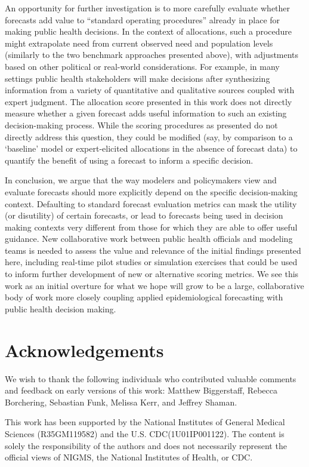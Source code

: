 \documentclass{article}\usepackage[]{graphicx}\usepackage[]{xcolor}
\begin{document}
An opportunity for further investigation is to more carefully evaluate whether forecasts add value to 
``standard operating procedures'' already in place for making public health decisions. In the context of allocations,
such a procedure might extrapolate need from current observed need and population levels (similarly to the two benchmark
approaches presented above), with adjustments based on other political or real-world considerations. For example, in
many settings public health stakeholders will make decisions after synthesizing information from a variety of
quantitative and qualitative sources coupled with expert judgment. The allocation score presented in this work does not
directly measure whether a given forecast adds useful information to such an existing decision-making process. While the
scoring procedures as presented do not directly address this question, they could be modified (say, by comparison to a
`baseline' model or expert-elicited allocations in the absence of forecast data) to quantify the benefit of using a
forecast to inform a specific decision.

In conclusion, we argue that the way modelers and policymakers view and evaluate forecasts should more explicitly depend on
the specific decision-making context. Defaulting to standard forecast evaluation metrics can mask the utility (or
disutility) of certain forecasts, or lead to forecasts being used in decision making contexts very different from those
for which they are able to offer useful guidance. New collaborative work between public health officials and modeling teams is
needed to assess the value and relevance of the initial findings presented here, including real-time pilot studies or
simulation exercises that could be used to inform further development of new or alternative scoring metrics. We see this
work as an initial overture for what we hope will grow to be a large, collaborative body of work more closely coupling
applied epidemiological forecasting with public health decision making.

\section*{Acknowledgements}

We wish to thank the following individuals who contributed valuable comments and feedback on early versions of this
work: Matthew Biggerstaff, Rebecca Borchering, Sebastian Funk, Melissa Kerr, and Jeffrey Shaman.

This work has been supported by the National Institutes of General Medical Sciences (R35GM119582) and the U.S.
CDC(1U01IP001122). The content is solely the responsibility of the authors and does not necessarily represent the
official views of NIGMS, the National Institutes of Health, or CDC.


\end{document}
